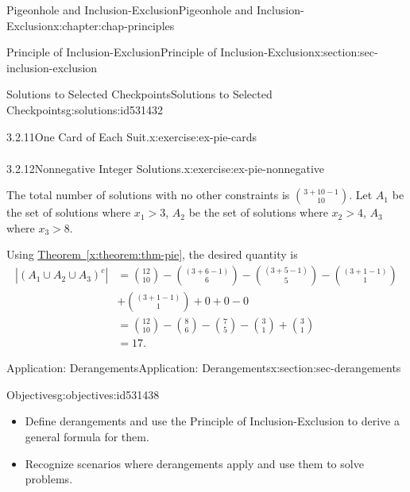 \documentclass[oneside,10pt,]{book}
\newcommand{\xreffont}{\relax}
\numberwithin{equation}{section}
\newlength{\qrsize}
\newlength{\previewwidth}
\newcommand{\gt}{>}
\newcommand{\amp}{&}
\begin{document}
\begin{chapterptx}{Pigeonhole and Inclusion-Exclusion}{}{Pigeonhole and Inclusion-Exclusion}{}{}{x:chapter:chap-principles}
\begin{sectionptx}{Principle of Inclusion-Exclusion}{}{Principle of Inclusion-Exclusion}{}{}{x:section:sec-inclusion-exclusion}
\begin{solutions-subsection-numberless}{Solutions to Selected Checkpoints}{}{Solutions to Selected Checkpoints}{}{}{g:solutions:id531432}
\begin{inlinesolution}{3.2.11}{One Card of Each Suit.}{x:exercise:ex-pie-cards}
\begin{align*}
\end{align*}
%
\end{inlinesolution}%
\begin{inlinesolution}{3.2.12}{Nonnegative Integer Solutions.}{x:exercise:ex-pie-nonnegative}%
\par\smallskip%
\noindent\hypertarget{g:solution:id531416-main}{}The total number of solutions with no other constraints is \(\displaystyle\binom{3+10-1}{10}\). Let \(A_1\) be the set of solutions where \(x_1 \gt 3\), \(A_2\) be the set of solutions where \(x_2 \gt 4\), \(A_3\) where \(x_3 \gt 8\).%
\par
Using \hyperref[x:theorem:thm-pie]{Theorem~{\xreffont\ref{x:theorem:thm-pie}}}, the desired quantity is%
\begin{align*}
|(A_1 \cup A_2 \cup A_3)^c| \amp = {{12}\choose{10}} - {(3+6-1)\choose{6}} - {(3+5-1)\choose{5}} - {(3+1-1)\choose{1}} \\
\amp + {{(3+1-1)}\choose{1}} + 0 + 0 - 0 \\
\amp = {{12}\choose{10}} - {{8}\choose{6}} - {{7}\choose{5}} - {{3}\choose{1}} + {{3}\choose{1}}\\
\amp = 17\text{.}
\end{align*}
%
\end{inlinesolution}%
\end{solutions-subsection-numberless}
\end{sectionptx}
%
%
\typeout{************************************************}
\typeout{************************************************}
%
\begin{sectionptx}{Application: Derangements}{}{Application: Derangements}{}{}{x:section:sec-derangements}
\begin{objectives}{Objectives}{g:objectives:id531438}
%
\begin{itemize}[label=\textbullet]
\item{}Define derangements and use the Principle of Inclusion-Exclusion to derive a general formula for them.%
\item{}Recognize scenarios where derangements apply and use them to solve problems.%
\end{itemize}
\end{objectives}
\begin{sidebyside}{1}{0}{0}{0}%
\begin{sbspanel}{1}%
\setlength{\qrsize}{9em}
\setlength{\previewwidth}{\linewidth}
\addtolength{\previewwidth}{-\qrsize}
\begin{tcbraster}[raster columns=2, raster column skip=1pt, raster halign=center, raster force size=false, raster left skip=0pt, raster right skip=0pt]%

\end{tcbraster}
\end{sbspanel}
\end{sidebyside}
\end{sectionptx}
\end{chapterptx}
\end{document}
